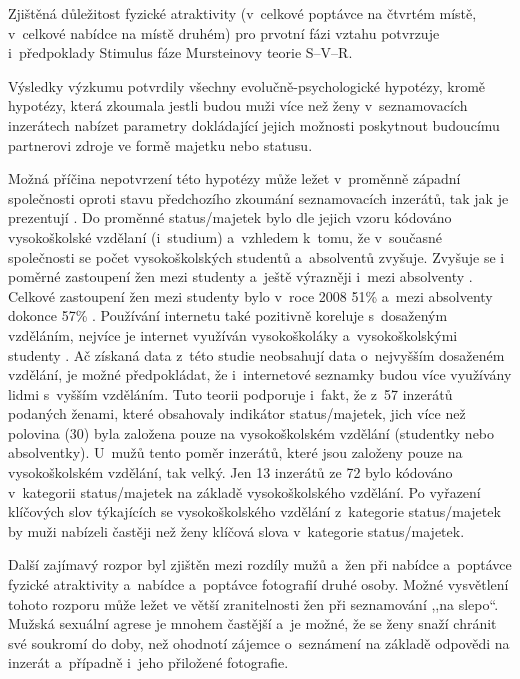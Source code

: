 \documentclass[a4paper, 12pt, notitlepage, oneside, numbers=noenddot]{report}
\begin{document}
Zjištěná důležitost fyzické atraktivity (v~celkové poptávce na čtvrtém
místě, v~celkové nabídce na místě druhém) pro prvotní fázi vztahu
potvrzuje i~předpoklady Stimulus fáze Mursteinovy
\citeyearpar{Murstein1970} teorie S--V--R.

Výsledky výzkumu potvrdily všechny evolučně-psychologické hypotézy,
kromě hypotézy, která zkoumala jestli budou muži více než ženy
v~seznamovacích inzerátech nabízet parametry dokládající jejich
možnosti poskytnout budoucímu partnerovi zdroje ve formě majetku nebo
statusu.

Možná příčina nepotvrzení této hypotézy může ležet v~proměnně západní
společnosti oproti stavu předchozího zkoumání seznamovacích inzerátů,
tak jak je prezentují \citet{BarrettDunbarLycett2007}.  Do proměnné
status/majetek bylo dle jejich vzoru kódováno vysokoškolské vzdělaní
(i~studium) a~vzhledem k~tomu, že v~současné společnosti se počet
vysokoškolských studentů a~absolventů zvyšuje.  Zvyšuje se i poměrné
zastoupení žen mezi studenty a~ještě výrazněji i~mezi absolventy
\citep{CSU2010}.  Celkové zastoupení žen mezi studenty bylo v~roce
2008 51\% a~mezi absolventy dokonce 57\% \citep{CSU2010}.  Používání
internetu také pozitivně koreluje s~dosaženým vzděláním, nejvíce je
internet využíván vysokoškoláky a~vysokoškolskými studenty
\citep{GalaczSmahel2007}.  Ač získaná data z~této studie neobsahují
data o~nejvyšším dosaženém vzdělání, je možné předpokládat, že
i~internetové seznamky budou více využívány lidmi s~vyšším vzděláním.
Tuto teorii podporuje i~fakt, že z~57 inzerátů podaných ženami, které
obsahovaly indikátor status/majetek, jich více než polovina (30) byla
založena pouze na vysokoškolském vzdělání (studentky nebo
absolventky).  U~mužů tento poměr inzerátů, které jsou založeny pouze
na vysokoškolském vzdělání, tak velký.  Jen 13 inzerátů ze 72 bylo
kódováno v~kategorii status/majetek na základě vysokoškolského
vzdělání.  Po vyřazení klíčových slov týkajících se vysokoškolského
vzdělání z~kategorie status/majetek by muži nabízeli častěji než ženy
klíčová slova v~kategorie status/majetek.

Další zajímavý rozpor byl zjištěn mezi rozdíly mužů a~žen při nabídce
a~poptávce fyzické atraktivity a~nabídce a~poptávce fotografií druhé
osoby.  Možné vysvětlení tohoto rozporu může ležet ve větší
zranitelnosti žen při seznamování ,,na slepo``. Mužská sexuální agrese
je mnohem častější a~je možné, že se ženy snaží chránit své soukromí
do doby, než ohodnotí zájemce o~seznámení na základě odpovědi na
inzerát a~případně i~jeho přiložené fotografie.
\end{document}
